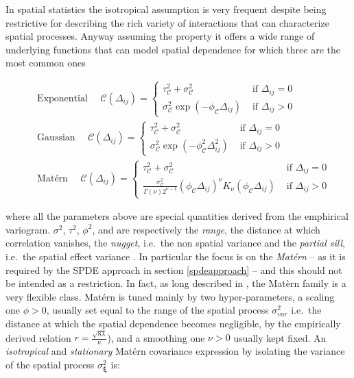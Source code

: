 \documentclass[
  12pt,
  a4paper,
  oneside]{book}
\theoremstyle{definition}
\theoremstyle{definition}
\theoremstyle{definition}
\theoremstyle{remark}
\begin{document}
In spatial statistics the isotropical assumption is very frequent despite being restrictive for describing the rich variety of interactions that can characterize spatial processes. Anyway assuming the property it offers a wide range of underlying functions that can model spatial dependence for which three are the most common ones \citep{Krainski2018}

\[
\begin{aligned}
&\text { Exponential } \quad \mathscr{C}(\Delta_{i j})=\left\{\begin{array}{cl}
\tau^{2}_{\mathscr{C}}+\sigma^{2}_{\mathscr{C}} & \text { if }  \Delta_{i j}=0 \\
\sigma^{2}_{\mathscr{C}} \exp (-\phi_{\mathscr{C}} \Delta_{i j}) & \text { if } \Delta_{i j}>0 
\end{array}\right.\\
&\text { Gaussian } \quad \mathscr{C}(\Delta_{i j})=\left\{\begin{array}{cl}
\tau^{2}_{\mathscr{C}}+\sigma^{2}_{\mathscr{C}} & \text { if } \Delta_{i j}=0 \\
\sigma^{2}_{\mathscr{C}} \exp \left(-\phi^{2}_{\mathscr{C}}  \Delta_{i j}^{2}\right) & \text { if } \Delta_{i j}>0 
\end{array}\right. \\
&\text { Matérn } \quad \mathscr{C}(\Delta_{i j})=\left\{\begin{array}{cl}
\tau^{2}_{\mathscr{C}}+\sigma^{2}_{\mathscr{C}} & \text { if } \Delta_{i j}=0 \\
\frac{\sigma^{2}_{\mathscr{C}}}{\Gamma(\nu) 2^{\nu-1}}(\phi_{\mathscr{C}}  \Delta_{i j})^{\nu} K_{\nu}(\phi_{\mathscr{C}}  \Delta_{i j}) & \text { if } \Delta_{i j}>0
\end{array}\right.
\end{aligned}
\]

where all the parameters above are special quantities derived from the emphirical variogram. \(\sigma^2\), \(\tau^2\), \(\phi^2\), and are respectively the \emph{range}, the distance at which correlation vanishes, the \emph{nugget}, i.e.~the non spatial variance and the \emph{partial sill}, i.e.~the spatial effect variance \citep{LecturePaci}.
In particular the focus is on the \emph{Matérn} -- as it is required by the SPDE approach in section \ref{spdeapproach} -- and this should not be intended as a restriction. In fact, as long described in \citet{gneiting2006geostatistical}, the Matèrn family is a very flexible class. Matérn is tuned mainly by two hyper-parameters, a scaling one \(\phi>0\), usually set equal to the range of the spatial process \(\sigma^{2}_{var}\) i.e.~the distance at which the spatial dependence becomes negligible, by the empirically derived relation \(r =\frac{\sqrt{8 \lambda}}{\kappa}\)), and a smoothing one \(\nu>0\) usually kept fixed. An \emph{isotropical} and \emph{stationary} Matérn covariance expression by isolating the variance of the spatial process \(\sigma_{\mathscr{\boldsymbol{\mathbf{\xi}}}}^{2}\) is:
\end{document}

